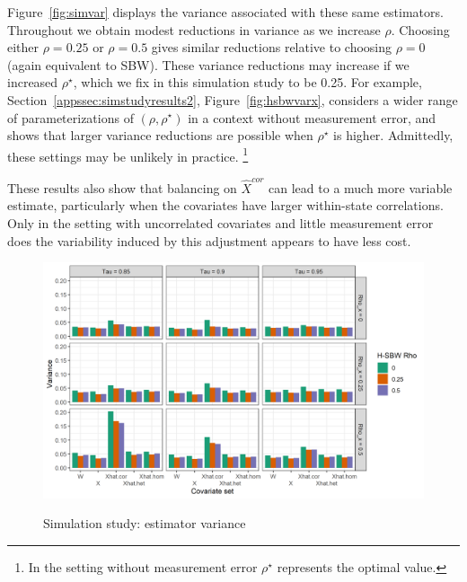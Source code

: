 Figure~\ref{fig:simvar} displays the variance associated with these same estimators. Throughout we obtain modest reductions in variance as we increase $\rho$. Choosing either $\rho = 0.25$ or $\rho = 0.5$ gives similar reductions relative to choosing $\rho = 0$ (again equivalent to SBW). These variance reductions may increase if we increased $\rho^\star$, which we fix in this simulation study to be 0.25. For example, Section~\ref{appssec:simstudyresults2}, Figure~\ref{fig:hsbwvarx}, considers a wider range of parameterizations of $(\rho, \rho^\star)$ in a context without measurement error, and shows that larger variance reductions are possible when $\rho^\star$ is higher. Admittedly, these settings may be unlikely in practice. \footnote{In the setting without measurement error $\rho^\star$ represents the optimal value.}

These results also show that balancing on $\hat{X}^{cor}$ can lead to a much more variable estimate, particularly when the covariates have larger within-state correlations. Only in the setting with uncorrelated covariates and little measurement error does the variability induced by this adjustment appears to have less cost.

\begin{figure}[H]
\begin{center}
    \caption{Simulation study: estimator variance}\label{fig:simvar}
    \label{fig:loveplotc1}
    \includegraphics[scale=0.5]{01_Plots/var-plot.png}
\end{center}
\end{figure}

